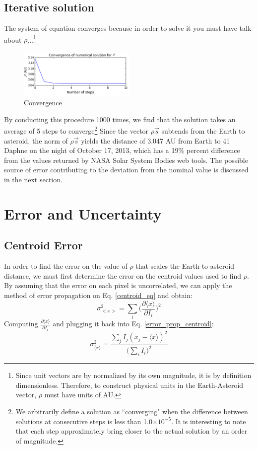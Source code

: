 \documentclass[authoryear, 12pt,5p, times]{elsarticle}
\begin{document}
    \subsection{Iterative solution}
The system of equation converges because in order to solve it you must have 
    talk about $\rho$...\footnote{Since unit vectors are by normalized by its own magnitude, it is by definition dimensionless. Therefore, to construct physical units in the Earth-Asteroid vector, $\rho$ must have units of AU.}
    \label{iterative_soln}
    	\begin{figure}[h!]
\includegraphics[width=0.5\textwidth]{figures/convergence_example}
\caption{ Convergence}
\label{convergence_example}
\end{figure}
   By conducting this procedure 1000 times, we find that the solution takes an average of 5 steps to converge\footnote{ We arbitrarily define a solution as ``converging" when the difference between solutions at consecutive steps is less than 1.0$\times10^{-5}$. It is interesting to note that each step approximately  bring  closer to the actual solution by an order of magnitude. } 
Since the vector $\rho \vec{s}$ subtends from the Earth to asteroid, the norm of  $\rho \vec{s}$ yields the distance of 3.047 AU from Earth to 41 Daphne on the night of October 17, 2013, which has a 19\% percent difference from the values returned by NASA Solar System Bodies web tools. The possible source of error  contributing to the deviation from the nominal value is discussed in the next section. 
\section{Error and Uncertainty}
\subsection{Centroid Error}
\label{centroid_error}
In order to find the error on the value of $\rho$ that scales the Earth-to-asteroid distance, we must first determine the error on the centroid values used to find $\rho$. 
By assuming that the error on each pixel is uncorrelated, we can apply the method of error propagation on Eq. \ref{centroid_eq} and obtain:
\begin{equation}
\sigma^2_{<x>}=\sum_{i} \Bigg(\frac{\partial \langle x\rangle}{\partial I_i}\Bigg)^2
\label{error_prop_centroid}
\end{equation} 
Computing $\frac{\partial \langle x\rangle}{\partial I_i}$ and plugging it back into Eq. \ref{error_prop_centroid}: 
\begin{equation}
\sigma^2_{\langle x\rangle}=\frac{\sum\limits_{j}I_j (x_j-\langle x\rangle)^2 }{\Big(\sum \limits_{i} I_i\Big)^2}
\end{equation}
\end{document}
